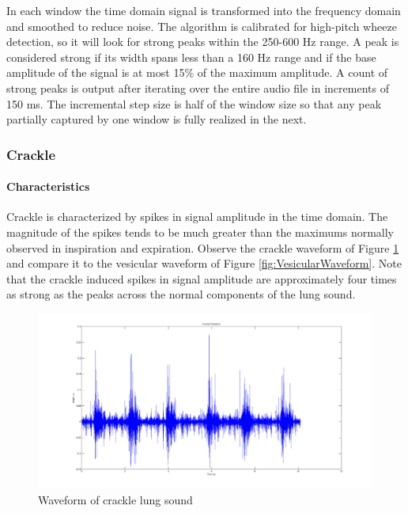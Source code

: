 \documentclass{article}
\begin{document}
In each window the time domain signal is transformed into the frequency domain and smoothed to reduce noise. The algorithm is calibrated for high-pitch wheeze detection, so it will look for strong peaks within the 250-600 Hz range. A peak is considered strong if its width spans less than a 160 Hz range and if the base amplitude of the signal is at most 15\% of the maximum amplitude. A count of strong peaks is output after iterating over the entire audio file in increments of 150 ms. The incremental step size is half of the window size so that any peak partially captured by one window is fully realized in the next.\\

\subsubsection{Crackle}

\paragraph{Characteristics}

Crackle is characterized by spikes in signal amplitude in the time domain. The magnitude of the spikes tends to be much greater than the maximums normally observed in inspiration and expiration. Observe the crackle waveform of Figure \ref{fig:CrackleWaveform} and compare it to the vesicular waveform of Figure \ref{fig:VesicularWaveform}. Note that the crackle induced spikes in signal amplitude are approximately four times as strong as the peaks across the normal components of the lung sound.\\

\begin{figure}[H]
	\includegraphics[width=\linewidth]{images/CrackleWaveform.png}
	\caption{Waveform of crackle lung sound}
 	\label{fig:CrackleWaveform}
\end{figure}
\end{document}
